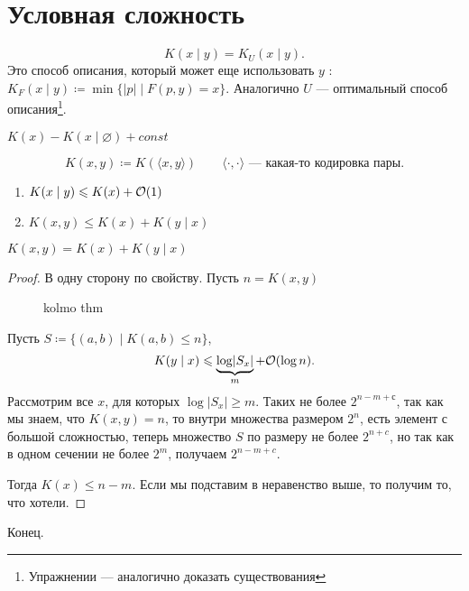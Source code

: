 \section{Условная сложность}
\[
	K(x \mid y) = K_{U}\left( x \mid y \right) 
.\] 
Это способ описания, который может еще использовать $ y$ : 
$ K_{F}(x \mid y) \coloneqq \min \{\lvert p \rvert \mid F(p, y) = x\}$. Аналогично $ U$ --- оптимальный способ описания\footnote{Упражнении --- аналогично доказать существования}.

\begin{note}
	$ K(x) - K(x \mid \varnothing) + const$
\end{note}
\[
	K(x, y) \coloneqq K(\langle x, y \rangle) \qquad \langle\cdot  , \cdot \rangle\text{ --- какая-то кодировка пары}
.\] 
\begin{prop}
    \begin{enumerate}
		\item $ K(x \mid y) \leqslant  K(x) + \mathcal{O}(1)$
		\item $ K(x, y) \le  K(x) + K(y \mid x)$
    \end{enumerate}
\end{prop}

\begin{thm}
	$ K(x, y) =  K(x) + K(y \mid x)$
\end{thm}
\begin{proof}
	В одну сторону по свойству. Пусть  $ n = K(x, y) $ 
\begin{figure}[ht]
    \centering
    \caption{kolmo thm}
    \label{fig:kolmo-thm}
\end{figure}
Пусть $ S \coloneqq \{(a, b) \mid K(a, b) \le n\}$,
\[
	K(y \mid x) \leqslant  \underbrace{\log \lvert   S_x\rvert}_{m} + \mathcal{O}(\log n)
.\] 
Рассмотрим все $ x$, для которых $ \log \lvert S_x \rvert  \ge  m$. Таких не более $ 2^{n-m + с}$, так как мы знаем, что $ K(x, y) = n$, то внутри множества размером  $ 2^{n}$, есть элемент с большой сложностью, теперь множество $ S$ по размеру не более  $ 2^{n+c}$, но так как в одном сечении не более $ 2^{m}$, получаем  $ 2^{n-m+c}$.

Тогда $ K(x) \le n -m $. Если мы подставим в неравенство выше, то получим то, что хотели.
\end{proof}
Конец.
